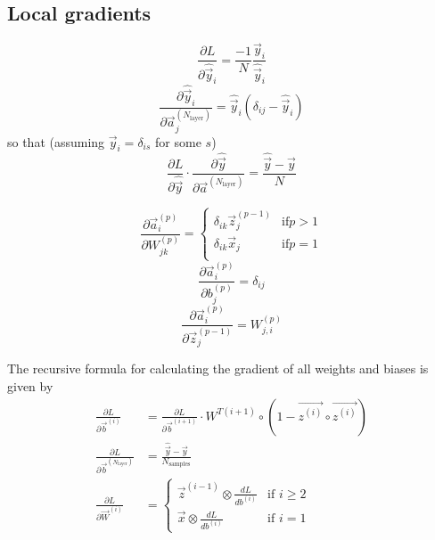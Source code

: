 \documentclass[oneside]{memoir}
\newcommand{\yhat}{\ensuremath{\hat{\vec{y}}}}
\begin{document}
\subsection{Local gradients}

\begin{equation}
  \label{dLdyhat}
  \frac{\partial L}{\partial \hat{\vec{y}}_i} = \frac{-1}{N} \frac{\vec{y}_i}{\hat{\vec{y}}_i}
\end{equation}
\begin{equation}
  \label{dyhatda}
  \frac{\partial \hat{\vec{y}}_i}{\partial \vec{a}_j^{(N_{\text{layer}})}} = \hat{\vec{y}}_i ( \delta_{ij} - \hat{\vec{y}}_i)
\end{equation}
so that (assuming $\vec{y}_i= \delta_{is}$ for some $s$) 
\begin{equation}
  \label{dLdyhat times dyhatda}
  \frac{\partial L}{\partial \hat{\vec{y}}} \cdot \frac{\partial \hat{\vec{y}}}{\partial \vec{a}^{(N_{\text{layer}})}}  = \frac{\yhat- \vec{y}}{N}
\end{equation}

\begin{equation}
  \label{dadW}
  \frac{\partial \vec{a}_i^{(p)}}{\partial W^{(p)}_{jk}} = 
  \begin{cases}
    \delta_{ik} \vec{z}_j^{(p-1)} & \text{if} p > 1 \\
    \delta_{ik} \vec{x}_j& \text{if} p = 1 \\
  \end{cases}
\end{equation}
\begin{equation}
  \label{dadb}
  \frac{\partial \vec{a}_i^{(p)}}{\partial b^{(p)}_{j}} = \delta_{ij}
\end{equation}
\begin{equation}
  \label{dadz}
  \frac{\partial \vec{a}_i^{(p)}}{\partial \vec{z}^{(p-1)}_{j}} = W_{j,i}^{(p)}
\end{equation}



The recursive formula for calculating the gradient of all weights and biases is given by
\begin{align}
  \label{dLdb_i}
  \frac{\partial L}{\partial \vec{b}^{(i)}} &= \frac{\partial L}{\partial \vec{b}^{(i+1)}} \cdot{W}^{T(i+1)} \circ (1-\vec{z^{(i)}}\circ \vec{z^{(i)}})\\
  \frac{\partial L}{\partial \vec{b}^{(N_\text{layer})}} &= \frac{\hat{\vec{y}}-\vec{y} }{N_{\text{samples}}}\\
  \label{dLdW_i}
  \frac{\partial L}{\partial \vec{W}^{(i)}} &=
                                              \begin{cases}
                                                \vec{z}^{(i-1)} \otimes \frac{dL}{db^{(i)}} & \text{if } i \geq 2 \\
                                                \vec{x}\otimes \frac{dL}{db^{(i)}}  & \text{if } i = 1
                                              \end{cases}
\end{align}
\end{document}
